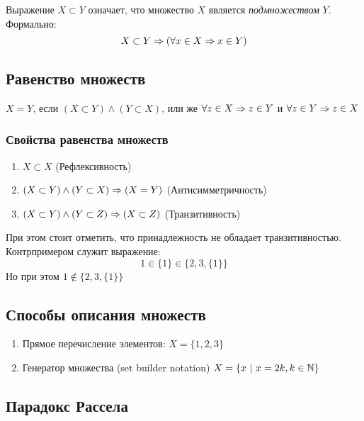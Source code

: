 \begin{definition}
    Выражение $X \subset Y$ означает, что множество $X$ является \textit{подмножеством} $Y$. Формально:
    $$
        X \subset Y \Rightarrow (\forall x \in X \Rightarrow x \in Y)
    $$
\end{definition}
 
\subsection{Равенство множеств}
 
\begin{definition}
    $X = Y$, если $(X \subset Y) \wedge (Y \subset X)$, или же $\forall z \in X \Rightarrow z \in Y$ и $\forall z \in Y \Rightarrow z \in X$
\end{definition}
 
\subsubsection*{Свойства равенства множеств}
 
\begin{enumerate}
     \item $X \subset X$ (Рефлексивность)
     \item $(X \subset Y) \wedge (Y \subset X) \Rightarrow (X = Y)$ (Антисимметричность)
     \item $(X \subset Y) \wedge (Y \subset Z) \Rightarrow (X \subset Z)$ (Транзитивность)
\end{enumerate}
 
\begin{definition}
    При этом стоит отметить, что принадлежность не обладает транзитивностью. Контрпримером служит выражение:
    $$
        1 \in \{1\} \in \{2, 3, \{1\}\}
    $$
    Но при этом $1 \notin \{2, 3, \{1\}\}$
\end{definition}
 
\subsection{Способы описания множеств}
 
\begin{enumerate}
     \item Прямое перечисление элементов: $X = \{1, 2, 3\}$
     \item Генератор множества (set builder notation) $X = \{x\ |\ x = 2k, k \in \mathbb{N}\}$
\end{enumerate}
 
\subsection{Парадокс Рассела}
 
